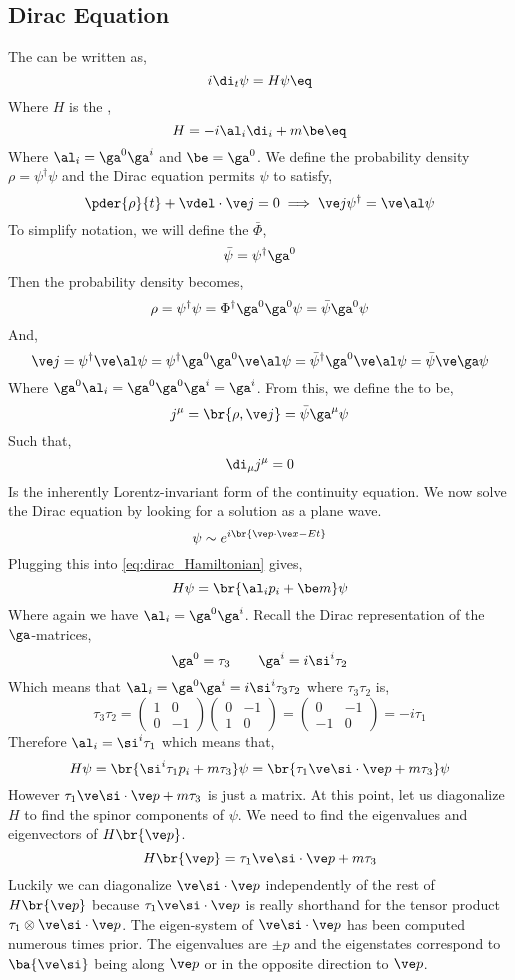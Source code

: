 \documentclass{article}
\begin{document}
\subsection{Dirac Equation}
The  can be written as,
\[ i \di_t \psi = H \psi \eq \label{eq:dirac_equation}\]
Where $H$ is the ,
\[ H = - i \al_i \di_i + m \be \eq \label{eq:dirac_Hamiltonian}\]
Where $\al_i = \ga^{0} \ga^{i}$ and $\be = \ga^{0}$. We define the probability density $\rho = \psi^{\dagger} \psi$ and the Dirac equation permits $\psi$ to satisfy,
\[ \pder{\rho}{t} + \vdel \cdot \ve j = 0 \implies \ve j \psi^{\dagger} = \ve \al \psi \]
To simplify notation, we will define the  $\bar{\Phi}$,
\[ \bar{\psi} = \psi^{\dagger} \ga^{0} \]
Then the probability density becomes,
\[ \rho = \psi^{\dagger}\psi = \Phi^{\dagger} \ga^{0} \ga^{0} \psi = \bar \psi \ga^{0} \psi \]
And,
\[ \ve j = \psi^{\dagger} \ve \al \psi = \psi^{\dagger} \ga^{0} \ga^{0} \ve \al \psi = \bar \psi^{\dagger} \ga^{0} \ve \al \psi = \bar \psi \ve \ga \psi \]
Where $\ga^{0}\al_{i} = \ga^{0} \ga^{0} \ga^{i} = \ga^{i}$. From this, we define the  to be,
\[ j^{\mu} = \br{\rho ,\ve j} = \bar \psi \ga^{\mu} \psi \]
Such that,
\[ \di_{\mu} j^{\mu} = 0 \]
Is the inherently Lorentz-invariant form of the continuity equation. We now solve the Dirac equation by looking for a solution as a plane wave.
\[ \psi \sim e^{i\br{\ve p \cdot \ve x - E t}}\]
Plugging this into \cref{eq:dirac_Hamiltonian} gives,
\[ H\psi = \br{\al_i p_i + \be m}\psi \]
Where again we have $\al_i = \ga^{0} \ga^{i}$. Recall the Dirac representation of the $\ga$-matrices,
\[ \ga^{0} = \tau_3 \qquad \ga^{i} = i \si^{i} \tau_{2} \]
Which means that $\al_i = \ga^{0} \ga^{i} = i \si^{i} \tau_3 \tau_2$ where $\tau_3 \tau_2$ is,
\[ \tau_3 \tau_2 = \begin{pmatrix}
    1 & 0 \\ 0 & -1
\end{pmatrix}\begin{pmatrix}
    0 & -1 \\ 1 & 0
\end{pmatrix} = \begin{pmatrix}
    0 & -1 \\ -1 & 0
\end{pmatrix} = -i\tau_1 \]
Therefore $\al_i = \si^{i} \tau_{1}$ which means that,
\[ H\psi = \br{\si^{i} \tau_{1} p_i + m \tau_{3}}\psi = \br{\tau_1 \ve \si \cdot \ve p + m \tau_3} \psi \]
However $\tau_1 \ve \si \cdot \ve p + m \tau_3$ is just a matrix. At this point, let us diagonalize $H$ to find the spinor components of $\psi$. We need to find the eigenvalues and eigenvectors of $H\br{\ve p}$.
\[ H\br{\ve p} = \tau_1 \ve \si \cdot \ve p + m \tau_3 \]
Luckily we can diagonalize $\ve \si \cdot \ve p$ independently of the rest of $H\br{\ve p}$ because $\tau_1 \ve \si \cdot \ve p$ is really shorthand for the tensor product $\tau_1 \otimes \ve \si \cdot \ve p$. The eigen-system of $\ve \si \cdot \ve p$ has been computed numerous times prior. The eigenvalues are $\pm p$ and the eigenstates correspond to $\ba{\ve \si}$ being along $\ve p$ or in the opposite direction to $\ve p$. \\
\end{document}
